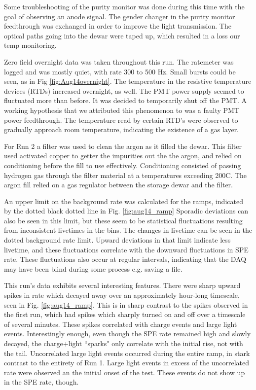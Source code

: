 Some troubleshooting of the purity monitor was done during this time with the goal of observing an anode signal.
The gender changer in the purity monitor feedthrough was exchanged in order to improve the light transmission.
The optical paths going into the dewar were taped up, which resulted in a loss our temp monitoring.

 Zero field overnight data was taken throughout this run.
 The ratemeter was logged and was mostly quiet, with rate 300 to 500 Hz.
 Small bursts could be seen, as in Fig \ref{fig:Aug14overnight}.
The temperature in the resistive temperature devices (RTDs) increased overnight, as well.
 The PMT power supply seemed to fluctuated more than before.
 It was decided to temporarily shut off the PMT.
 A working hypothesis that we attributed this phenomenon to was a faulty PMT power feedthrough. 
 The temperature read by certain RTD's were observed to gradually approach room  temperature, indicating the existence of a gas layer.

For Run 2 a filter was used to clean the argon as it filled the dewar.
This filter used activated copper to getter the impurities out the the argon, and relied on conditioning before the fill to use effectively.
Conditioning consisted of passing hydrogen gas through the filter material at a temperatures exceeding 200C.
The argon fill relied on a gas regulator between the storage dewar and the filter.

An upper limit on the background rate was calculated for the ramps, indicated by the dotted black dotted line in Fig. \ref{fig:aug14_ramp}
Sporadic deviations can also be seen in this limit, but these seem to be statistical fluctuations resulting from inconsistent livetimes in the bins.
The changes in livetime can be seen in the dotted background rate limit.
Upward deviations in that limit indicate less livetime, and these fluctuations correlate with the downward fluctuations in SPE rate.
These fluctuations also occur at regular intervals, indicating that the DAQ may have been blind during some process e.g. saving a file.

This run's data exhibits several interesting features. 
There were sharp upward spikes in rate which decayed away over an approximately hour-long timescale, seen in Fig. \ref{fig:aug14_ramp}.
This is in sharp contrast to the spikes observed in the first run, which had spikes which sharply turned on and off over a timescale of several minutes.
These spikes correlated with charge events and large light events.
Interestingly enough, even though the SPE rate remained high and slowly decayed, the charge+light ``sparks" only correlate with the initial rise, not with the tail.
Uncorrelated large light events occurred during the entire ramp, in stark contrast to the entirety of Run 1.
Large light events in excess of the uncorrelated rate were observed an the initial onset of the test.
These events do not show up in the SPE rate, though.

